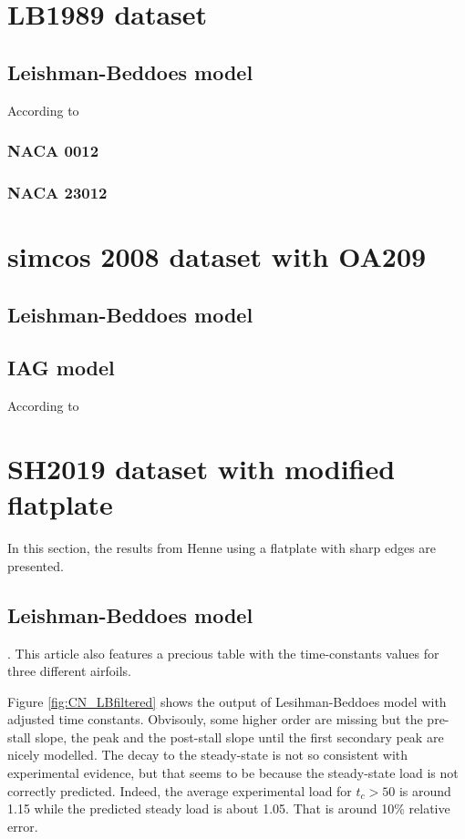 \section{LB1989 dataset}

\subsection{Leishman-Beddoes model}

According to \cite{leishman_semi-empirical_1989}

\subsubsection{NACA 0012}

\subsubsection{NACA 23012}

\section{simcos 2008 dataset with OA209}

\subsection{Leishman-Beddoes model}

\subsection{IAG model}

According to \cite{bangga_improved_2020}

\section{SH2019 dataset with modified flatplate}

In this section, the results from Henne using a flatplate with sharp edges are presented. 

\subsection{Leishman-Beddoes model}

\cite{leishman_state-space_1989}.
This article also features a precious table with the time-constants values for three different airfoils.

Figure \ref{fig:CN_LBfiltered} shows the output of Lesihman-Beddoes model with adjusted time constants. Obvisouly, some higher order are missing but the pre-stall slope, the peak and the post-stall slope until the first secondary peak are nicely modelled. The decay to the steady-state is not so consistent with experimental evidence, but that seems to be because the steady-state load is not correctly predicted. Indeed, the average experimental load for $t_c > 50$ is around 1.15 while the predicted steady load is about 1.05. That is around 10\% relative error. 

